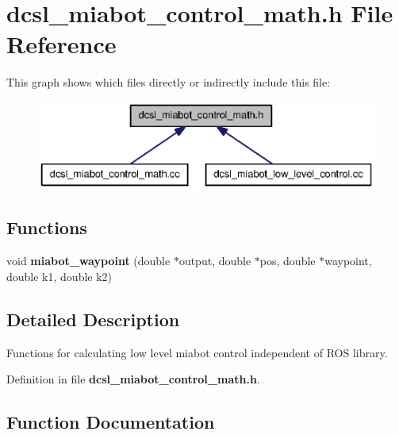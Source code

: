 \section{dcsl\-\_\-miabot\-\_\-control\-\_\-math.\-h \-File \-Reference}
\label{dcsl__miabot__control__math_8h}
\-This graph shows which files directly or indirectly include this file\-:
\nopagebreak
\begin{figure}[H]
\begin{center}
\leavevmode
\includegraphics[width=350pt]{dcsl__miabot__control__math_8h__dep__incl}
\end{center}
\end{figure}
\subsection*{\-Functions}
\begin{DoxyCompactItemize}
\item 
void {\bf miabot\-\_\-waypoint} (double $\ast$output, double $\ast$pos, double $\ast$waypoint, double k1, double k2)
\end{DoxyCompactItemize}


\subsection{\-Detailed \-Description}
\-Functions for calculating low level miabot control independent of \-R\-O\-S library. 

\-Definition in file {\bf dcsl\-\_\-miabot\-\_\-control\-\_\-math.\-h}.



\subsection{\-Function \-Documentation}
